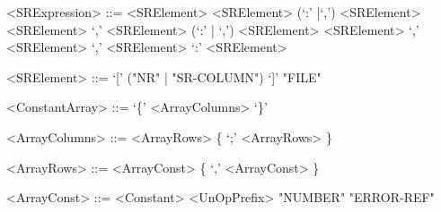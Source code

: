 \begin{grammar}
<SRExpression> ::= <SRElement>
	\alt <SRElement> (`:' |`,') <SRElement>
	\alt <SRElement> `,' <SRElement> (`:' | `,')  <SRElement>
	\alt <SRElement> `,' <SRElement> `,' <SRElement> `:' <SRElement>

<SRElement> ::= `[' ("NR" | "SR-COLUMN") `]'
	\alt "FILE"


<ConstantArray> ::= `\{' <ArrayColumns> `\}'

<ArrayColumns> ::= <ArrayRows> \{ `;' <ArrayRows> \}

<ArrayRows> ::= <ArrayConst> \{ `,' <ArrayConst> \}
	
<ArrayConst> ::= <Constant>
	\alt <UnOpPrefix> "NUMBER"
	\alt "ERROR-REF"

\end{grammar}